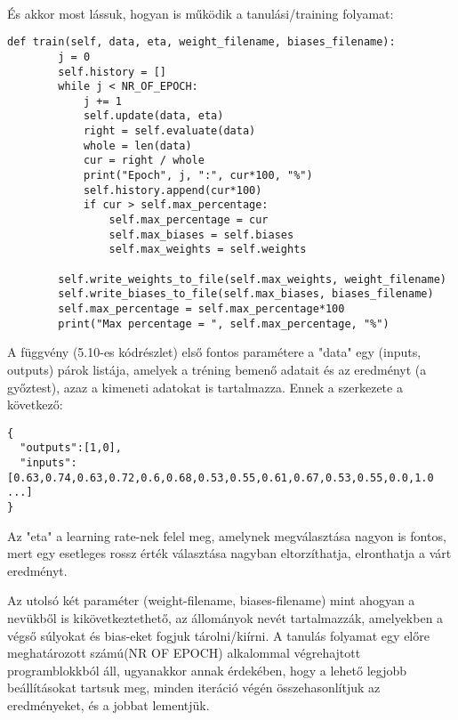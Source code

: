 \paragraph{}
És akkor most lássuk, hogyan is működik a tanulási/training folyamat:
\begin{lstlisting}[caption= A train függvény]
def train(self, data, eta, weight_filename, biases_filename):
        j = 0
        self.history = []
        while j < NR_OF_EPOCH:
            j += 1
            self.update(data, eta)
            right = self.evaluate(data)
            whole = len(data)
            cur = right / whole
            print("Epoch", j, ":", cur*100, "%")
            self.history.append(cur*100)
            if cur > self.max_percentage:
                self.max_percentage = cur
                self.max_biases = self.biases
                self.max_weights = self.weights

        self.write_weights_to_file(self.max_weights, weight_filename)    
        self.write_biases_to_file(self.max_biases, biases_filename)
        self.max_percentage = self.max_percentage*100
        print("Max percentage = ", self.max_percentage, "%")
\end{lstlisting}

A függvény (5.10-es kódrészlet) első fontos paramétere a "data" egy (inputs, outputs) párok listája, amelyek a tréning bemenő adatait és az eredményt (a győztest), azaz a kimeneti adatokat is tartalmazza. Ennek a szerkezete a következő:

\begin{lstlisting}[caption= A data-paraméter egy eleme]
{
  "outputs":[1,0],
  "inputs":[0.63,0.74,0.63,0.72,0.6,0.68,0.53,0.55,0.61,0.67,0.53,0.55,0.0,1.0 ...]
}
\end{lstlisting}

Az "eta" a learning rate-nek felel meg, amelynek megválasztása nagyon is fontos, mert egy esetleges rossz érték választása nagyban eltorzíthatja, elronthatja a várt eredményt.
 
Az utolsó két paraméter (weight-filename, biases-filename) mint ahogyan a nevükből is kikövetkeztethető, az állományok nevét tartalmazzák, amelyekben a végső súlyokat és bias-eket fogjuk tárolni/kiírni. A tanulás folyamat egy előre meghatározott számú(NR OF EPOCH) alkalommal végrehajtott programblokkból áll, ugyanakkor annak érdekében, hogy a lehető legjobb beállításokat tartsuk meg, minden iteráció végén összehasonlítjuk az eredményeket, és a jobbat lementjük.

